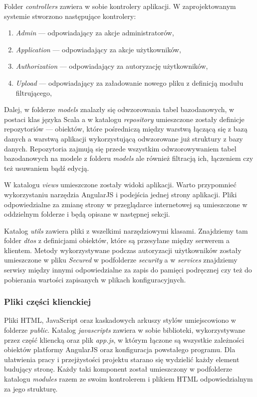 \documentclass[a4paper,12pt,twoside]{article}
\begin{document}
Folder \textit{controllers} zawiera w sobie kontrolery aplikacji.
W zaprojektowanym systemie stworzono następujące kontrolery:
\begin{enumerate}[1)]
\item \textit{Admin} — odpowiadający za akcje administratorów,
\item \textit{Application} — odpowiadający za akcje użytkowników,
\item \textit{Authorization} — odpowiadający za autoryzację użytkowników,
\item \textit{Upload} — odpowiadający za załadowanie nowego pliku z definicją modułu filtrującego,
\end{enumerate}

Dalej, w folderze \textit{models} znalazły się odwzorowania tabel bazodanowych,
w postaci klas języka Scala a w katalogu \textit{repository} umieszczone
zostały definicje repozytoriów — obiektów, które pośredniczą
między warstwą łączącą się z bazą danych a warstwą aplikacji
wykorzystującą odwzorowane już struktury z bazy danych.
Repozytoria zajmują się przede wszystkim odwzorowywaniem tabel bazodanowych na
modele z folderu \textit{models} ale również filtracją ich, łączeniem
czy też usuwaniem bądź edycją.

W katalogu \textit{views} umieszczone zostały widoki aplikacji.
Warto przypomnieć wykorzystaniu narzędzia AngularJS
i podejścia jednej strony aplikacji. Pliki odpowiedzialne
za zmianę strony w przeglądarce internetowej są umieszczone
w oddzielnym folderze i będą opisane w następnej sekcji.

Katalog \textit{utils} zawiera pliki z wszelkimi narzędziowymi
klasami. Znajdziemy tam folder \textit{dtos} z definicjami obiektów,
które są przesyłane między serwerem a klientem.
Metody wykorzystywane podczas autoryzacji użytkowników zostały umieszczone w pliku \textit{Secured} w podfolderze \textit{security} a w \textit{services} znajdziemy
serwisy między innymi odpowiedzialne za zapis do pamięci podręcznej czy też
do pobierania wartości zapisanych w plikach konfiguracyjnych.

\newpage
\subsubsection{Pliki części klienckiej}

Pliki HTML, JavaScript oraz kaskadowych arkuszy stylów umiejscowiono
w folderze \textit{public}.
Katalog \textit{javascripts} zawiera w sobie biblioteki, wykorzystywane przez
część kliencką oraz plik \textit{app.js}, w którym łączone są wszystkie
zależności obiektów platformy AngularJS oraz konfiguracja powstałego programu.
Dla ułatwienia pracy i przejżystości projektu starano się wydzielić każdy element budujący stronę. Każdy taki komponent został umieszczony w podfolderze
katalogu \textit{modules} razem ze swoim kontrolerem i plikiem HTML odpowiedzialnym
za jego strukturę.
\end{document}
